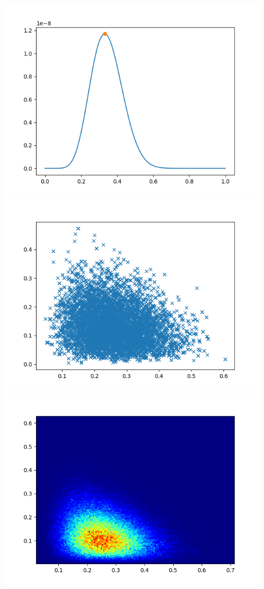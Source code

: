 \documentclass[pt12]{article}
\begin{document}
\newpage

\begin{center}
\includegraphics[scale=0.5]{hip20.png}\\
\includegraphics[scale=0.5]{sc20.png}\\
\includegraphics[scale=0.5]{den20.png}\\
\end{center}
\end{document}
